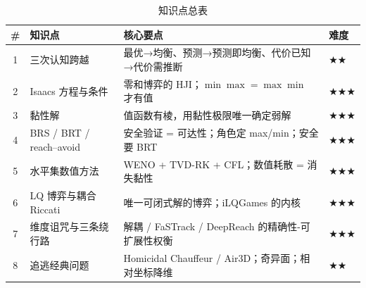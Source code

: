 \begin{table}[H]\centering\small
\caption{知识点总表}
\label{tab:dg-knowledge}
\begin{tabular}{clll}
\toprule
\# & 知识点 & 核心要点 & 难度 \\
\midrule
1 & 三次认知跨越 & 最优→均衡、预测→预测即均衡、代价已知→代价需推断 & \(\bigstar\bigstar\) \\
2 & Isaacs 方程与条件 & 零和博弈的 HJI；$\min\max=\max\min$ 才有值 & \(\bigstar\bigstar\bigstar\) \\
3 & 黏性解 & 值函数有棱，用黏性极限唯一确定弱解 & \(\bigstar\bigstar\bigstar\) \\
4 & BRS / BRT / reach--avoid & 安全验证 = 可达性；角色定 max/min；安全要 BRT & \(\bigstar\bigstar\bigstar\) \\
5 & 水平集数值方法 & WENO + TVD-RK + CFL；数值耗散 = 消失黏性 & \(\bigstar\bigstar\bigstar\) \\
6 & LQ 博弈与耦合 Riccati & 唯一可闭式解的博弈；iLQGames 的内核 & \(\bigstar\bigstar\bigstar\) \\
7 & 维度诅咒与三条绕行路 & 解耦 / FaSTrack / DeepReach 的精确性-可扩展性权衡 & \(\bigstar\bigstar\bigstar\) \\
8 & 追逃经典问题 & Homicidal Chauffeur / Air3D；奇异面；相对坐标降维 & \(\bigstar\bigstar\) \\
\bottomrule
\end{tabular}
\end{table}

